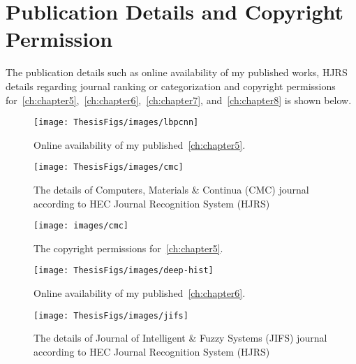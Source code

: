\section{Publication Details and Copyright Permission\label{appendixB}}
The publication details such as online availability of my published works, HJRS details regarding journal ranking or categorization and copyright permissions for~\cref{ch:chapter5},~\cref{ch:chapter6},~\cref{ch:chapter7}, and~\cref{ch:chapter8} is shown below.
\begin{figure}[!h]
	\centering
	\texttt{[image: ThesisFigs/images/lbpcnn]}
	\caption{Online availability of my published~\cref{ch:chapter5}.}
	\label{fig:lbpcnnnnnnn}
\end{figure}
\begin{figure}[!h]
	\centering
	\texttt{[image: ThesisFigs/images/cmc]}
	\caption{The details of Computers, Materials \& Continua (CMC) journal according to HEC Journal Recognition System (HJRS)}
	\label{fig:lbpcnnnnnnn}
\end{figure}
\begin{figure}[!h]
	\centering
	\texttt{[image: images/cmc]}
	\caption{The copyright permissions for~\cref{ch:chapter5}.}
	\label{fig:cmc}
\end{figure}

\begin{figure}[!h]
	\centering
	\texttt{[image: ThesisFigs/images/deep-hist]}
	\caption{Online availability of my published~\cref{ch:chapter6}.}
	\label{fig:lbpcnnnnnnn}
\end{figure}
\begin{figure}[!h]
	\centering
	\texttt{[image: ThesisFigs/images/jifs]}
	\caption{The details of Journal of Intelligent \& Fuzzy Systems (JIFS) journal according to HEC Journal Recognition System (HJRS)}
	\label{fig:lbpcnnnnnnn}
\end{figure}

